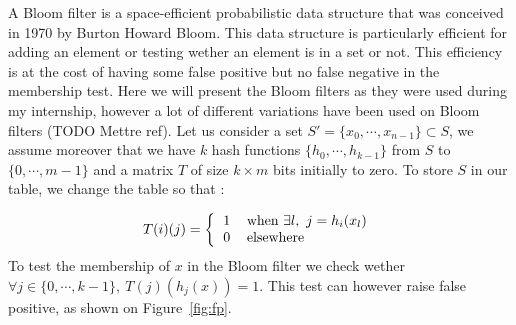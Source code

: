 A Bloom filter is a space-efficient probabilistic data structure that was conceived in 1970 by Burton Howard Bloom. This data structure is particularly efficient for adding an element or testing wether an element is in a set or not. This efficiency is at the cost of having some false positive but no false negative in the membership test. Here we will present the Bloom filters as they were used during my internship, however a lot of different variations have been used on Bloom filters (TODO Mettre ref). Let us consider a set $S' = \{x_0,\cdots,x_{n-1}\} \subset S$, we assume moreover that we have $k$ hash functions $\{h_0,\cdots,h_{k-1}\}$ from $S$ to $\{0,\cdots,m-1\}$ and a matrix $T$ of size $k \times m$ bits initially to zero. To store $S$ in our table, we change the table so that : 

\begin{equation}
T(i)(j) = \left \{ 
\begin{tabular}{c l} 
$1$ & when $\exists l,\ j = h_i(x_l)$ \\
0 & elsewhere
\end{tabular}
\right .
\end{equation}
To test the membership of $x$ in the Bloom filter we check wether $\forall j \in \{0,\cdots,k-1\},\ T(j)(h_j(x)) = 1$. This test can however raise 
false positive, as shown on Figure~\ref{fig:fp}.
